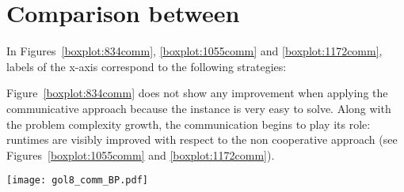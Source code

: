 \section{Comparison between \commstrs}

\begin{minipage}[c]{0.50\textwidth}
In Figures~\ref{boxplot:834comm}, \ref{boxplot:1055comm} and \ref{boxplot:1172comm}, labels of the x-axis correspond to the following strategies:


Figure~\ref{boxplot:834comm} does not show any improvement when applying the communicative approach because the instance is very easy to solve. Along with the problem complexity growth, the communication begins to play its role: runtimes are visibly improved with respect to the non  cooperative approach (see Figures~\ref{boxplot:1055comm} and \ref{boxplot:1172comm}).
\end{minipage}\hspace{0.05\textwidth}
\begin{minipage}[c]{0.40\textwidth}
\centering
\texttt{[image: gol8\_comm\_BP.pdf]}
\label{boxplot:834comm}
\end{minipage}

